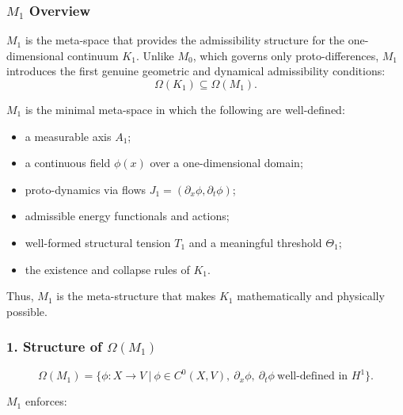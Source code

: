 

\subsubsection{\texorpdfstring{$M_1$}{M_1} Overview}
\label{sec:m1-overview}

$M_1$ is the meta-space that provides the admissibility structure for the
one-dimensional continuum $K_1$.
Unlike $M_0$, which governs only proto-differences, $M_1$ introduces the
first genuine geometric and dynamical admissibility conditions:
\[
\Omega(K_1) \subseteq \Omega(M_1).
\]

$M_1$ is the minimal meta-space in which the following are well-defined:

\begin{itemize}
    \item a measurable axis $A_1$;
    \item a continuous field $\phi(x)$ over a one-dimensional domain;
    \item proto-dynamics via flows $J_1=(\partial_x \phi, \partial_t \phi)$;
    \item admissible energy functionals and actions;
    \item well-formed structural tension $T_1$ and a meaningful threshold $\Theta_1$;
    \item the existence and collapse rules of $K_1$.
\end{itemize}

Thus, $M_1$ is the meta-structure that makes $K_1$ mathematically and physically possible.

\subsubsection*{1. Structure of \texorpdfstring{$\Omega(M_1)$}{\Omega(M_1)}}

\[
\Omega(M_1)
=
\Big\{
\phi : X \to V \ \big|\
\phi \in C^{0}(X,V),\
\partial_x \phi,\ \partial_t \phi\ \text{well-defined in } H^1
\Big\}.
\]

$M_1$ enforces:

